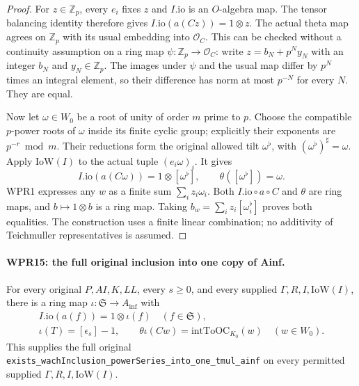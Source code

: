 \begin{proof}
For $z\in\mathbb Z_p$, every $e_i$ fixes $z$ and
$I.\mathrm{io}$ is an $O$-algebra map. The tensor balancing
identity therefore gives
$I.\mathrm{io}(a(Cz))=1\otimes z$.
The actual theta map agrees on $\mathbb Z_p$ with its usual
embedding into $\mathcal O_C$. This can be checked without a
continuity assumption on a ring map $\psi:\mathbb Z_p\to\mathcal O_C$:
write $z=b_N+p^Ny_N$ with an integer $b_N$ and
$y_N\in\mathbb Z_p$. The images under $\psi$ and the usual map
differ by $p^N$ times an integral element, so their difference
has norm at most $p^{-N}$ for every $N$. They are equal.

Now let $\omega\in W_0$ be a root of unity of order $m$
prime to $p$. Choose the compatible $p$-power roots of $\omega$
inside its finite cyclic group; explicitly their exponents are
$p^{-r}\bmod m$. Their reductions form the original allowed
tilt $\omega^\flat$, with $(\omega^\flat)^\sharp=\omega$.
Apply $\mathrm{IoW}(I)$ to the actual tuple $(e_i\omega)_i$.
It gives
\[
 I.\mathrm{io}(a(C\omega))=1\otimes[\omega^\flat],
       \qquad \theta([\omega^\flat])=\omega.
\]
WPR1 expresses any $w$ as a finite sum
$\sum_i z_i\omega_i$. Both $I.\mathrm{io}\circ a\circ C$ and
$\theta$ are ring maps, and $b\mapsto1\otimes b$ is a ring
map. Taking $b_w=\sum_i z_i[\omega_i^\flat]$ proves both
equalities. The construction uses a finite linear combination;
no additivity of Teichmuller representatives is assumed.
\end{proof}

\paragraph{WPR15: the full original inclusion into one copy of Ainf.}
\label{claim:WPR15}
For every original $P,AI,K,LL$, every $s\geq0$, and every
supplied $\Gamma,R,I,\mathrm{IoW}(I)$, there is a ring map
$\iota:\mathfrak S\to A_{\mathrm{inf}}$ with
\[
 \begin{gathered}
 I.\mathrm{io}(a(f))=1\otimes\iota(f)\quad(f\in\mathfrak S),\\
 \iota(T)=[\epsilon_s]-1,\qquad
 \theta\iota(Cw)=\mathrm{intToOC}_{K_0}(w)\quad(w\in W_0).
 \end{gathered}                                                     \tag{WPR.17}
\]
This supplies the full original
\texttt{exists\_wachInclusion\_powerSeries\_into\_one\_tmul\_ainf}
on every permitted supplied $\Gamma,R,I,\mathrm{IoW}(I)$.

